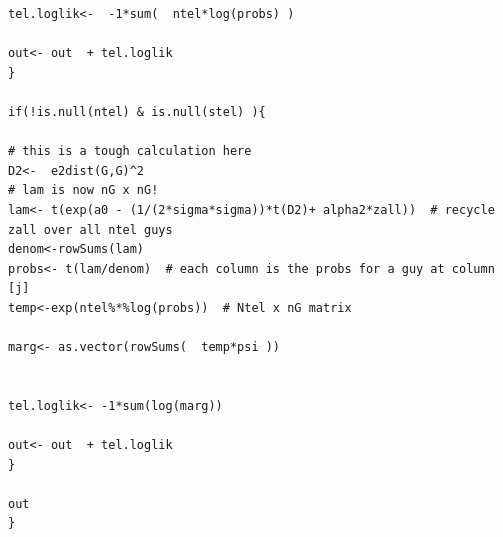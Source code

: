 \documentclass[12pt]{article}
\begin{document}
{\begin{verbatim}
tel.loglik<-  -1*sum(  ntel*log(probs) )

out<- out  + tel.loglik
}

if(!is.null(ntel) & is.null(stel) ){

# this is a tough calculation here
D2<-  e2dist(G,G)^2
# lam is now nG x nG!
lam<- t(exp(a0 - (1/(2*sigma*sigma))*t(D2)+ alpha2*zall))  # recycle zall over all ntel guys
denom<-rowSums(lam)
probs<- t(lam/denom)  # each column is the probs for a guy at column [j]
temp<-exp(ntel%*%log(probs))  # Ntel x nG matrix

marg<- as.vector(rowSums(  temp*psi ))


tel.loglik<- -1*sum(log(marg))

out<- out  + tel.loglik
}

out
}
\end{verbatim}
}





\clearpage
\newpage
\end{document}
